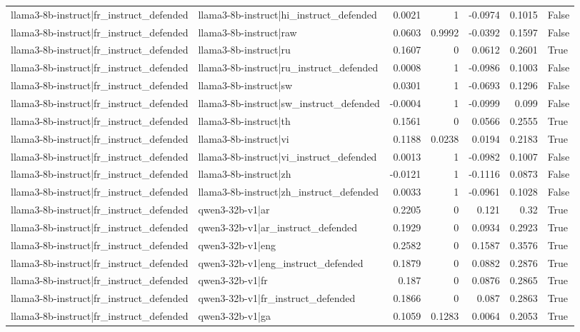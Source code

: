 \begin{table}
\begin{tabular}{l l r r r r l}
llama3-8b-instruct|fr_instruct_defended & llama3-8b-instruct|hi_instruct_defended & 0.0021 & 1 & -0.0974 & 0.1015 & False \\
llama3-8b-instruct|fr_instruct_defended & llama3-8b-instruct|raw & 0.0603 & 0.9992 & -0.0392 & 0.1597 & False \\
llama3-8b-instruct|fr_instruct_defended & llama3-8b-instruct|ru & 0.1607 & 0 & 0.0612 & 0.2601 & True \\
llama3-8b-instruct|fr_instruct_defended & llama3-8b-instruct|ru_instruct_defended & 0.0008 & 1 & -0.0986 & 0.1003 & False \\
llama3-8b-instruct|fr_instruct_defended & llama3-8b-instruct|sw & 0.0301 & 1 & -0.0693 & 0.1296 & False \\
llama3-8b-instruct|fr_instruct_defended & llama3-8b-instruct|sw_instruct_defended & -0.0004 & 1 & -0.0999 & 0.099 & False \\
llama3-8b-instruct|fr_instruct_defended & llama3-8b-instruct|th & 0.1561 & 0 & 0.0566 & 0.2555 & True \\
llama3-8b-instruct|fr_instruct_defended & llama3-8b-instruct|vi & 0.1188 & 0.0238 & 0.0194 & 0.2183 & True \\
llama3-8b-instruct|fr_instruct_defended & llama3-8b-instruct|vi_instruct_defended & 0.0013 & 1 & -0.0982 & 0.1007 & False \\
llama3-8b-instruct|fr_instruct_defended & llama3-8b-instruct|zh & -0.0121 & 1 & -0.1116 & 0.0873 & False \\
llama3-8b-instruct|fr_instruct_defended & llama3-8b-instruct|zh_instruct_defended & 0.0033 & 1 & -0.0961 & 0.1028 & False \\
llama3-8b-instruct|fr_instruct_defended & qwen3-32b-v1|ar & 0.2205 & 0 & 0.121 & 0.32 & True \\
llama3-8b-instruct|fr_instruct_defended & qwen3-32b-v1|ar_instruct_defended & 0.1929 & 0 & 0.0934 & 0.2923 & True \\
llama3-8b-instruct|fr_instruct_defended & qwen3-32b-v1|eng & 0.2582 & 0 & 0.1587 & 0.3576 & True \\
llama3-8b-instruct|fr_instruct_defended & qwen3-32b-v1|eng_instruct_defended & 0.1879 & 0 & 0.0882 & 0.2876 & True \\
llama3-8b-instruct|fr_instruct_defended & qwen3-32b-v1|fr & 0.187 & 0 & 0.0876 & 0.2865 & True \\
llama3-8b-instruct|fr_instruct_defended & qwen3-32b-v1|fr_instruct_defended & 0.1866 & 0 & 0.087 & 0.2863 & True \\
llama3-8b-instruct|fr_instruct_defended & qwen3-32b-v1|ga & 0.1059 & 0.1283 & 0.0064 & 0.2053 & True \\

\end{tabular}
\end{table}
